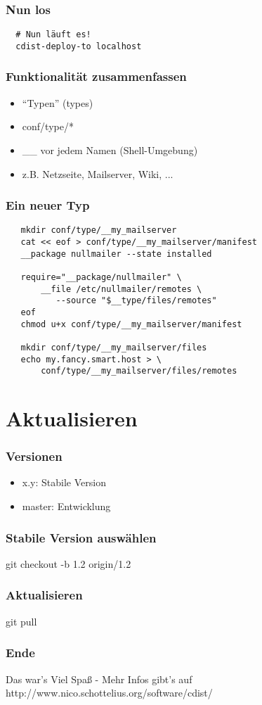 \documentclass{beamer}
\begin{document}
\begin{frame}[fragile]
  \frametitle{Nun los}
  \begin{verbatim}
  # Nun läuft es!
  cdist-deploy-to localhost
  \end{verbatim}
\end{frame}

\frame
{
  \frametitle{Funktionalität zusammenfassen}
  \begin{itemize}[<+->]
     \item "`Typen"' (types)
     \item conf/type/*
     \item \_\_ vor jedem Namen (Shell-Umgebung)
     \item z.B. Netzseite, Mailserver, Wiki, ...
  \end{itemize}
}

\begin{frame}[fragile]
   \frametitle{Ein neuer Typ}
   \begin{small}
   \begin{verbatim}
   mkdir conf/type/__my_mailserver
   cat << eof > conf/type/__my_mailserver/manifest
   __package nullmailer --state installed

   require="__package/nullmailer" \
       __file /etc/nullmailer/remotes \
          --source "$__type/files/remotes"
   eof
   chmod u+x conf/type/__my_mailserver/manifest

   mkdir conf/type/__my_mailserver/files
   echo my.fancy.smart.host > \
       conf/type/__my_mailserver/files/remotes
   \end{verbatim}
   \end{small}
\end{frame}

\section{Aktualisieren}
\begin{frame}[fragile]
  \frametitle{Versionen}
  \begin{itemize}[<+->]
     \item x.y: Stabile Version
     \item master: Entwicklung
  \end{itemize}
\end{frame}

\begin{frame}[fragile]
  \frametitle{Stabile Version auswählen}
  \begin{center}
  git checkout -b 1.2 origin/1.2
  \end{center}
\end{frame}

\begin{frame}[fragile]
  \frametitle{Aktualisieren}
  \begin{center}
  git pull
  \end{center}
\end{frame}

\frame
{
  \frametitle{Ende}
  \begin{block}{Das war's}
  Viel Spaß - Mehr Infos gibt's auf http://www.nico.schottelius.org/software/cdist/
  \end{block}
}
\end{document}
